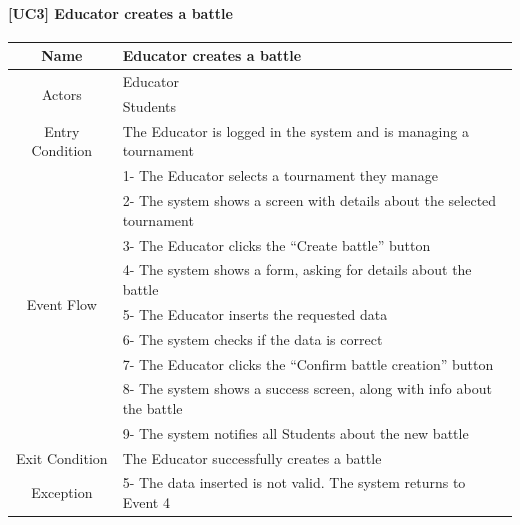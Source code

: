 \documentclass{article}
\begin{document}
\paragraph{[UC3] Educator creates a battle}
\begin{center}
\begin{tabular}{|c|m{40em}|}
\hline
Name & Educator creates a battle\\
\hline
\multirow{2}{4em}{Actors}
& Educator\\
& Students\\
\hline
Entry Condition & The Educator is logged in the system and is managing a tournament\\
\hline
\multirow{9}{4em}{Event Flow}
& 1- The Educator selects a tournament they manage\\
& 2- The system shows a screen with details about the selected tournament\\
& 3- The Educator clicks the “Create battle” button\\
& 4- The system shows a form, asking for details about the battle\\
& 5- The Educator inserts the requested data\\
& 6- The system checks if the data is correct\\
& 7- The Educator clicks the “Confirm battle creation” button\\
& 8- The system shows a success screen, along with info about the battle\\
& 9- The system notifies all Students about the new battle\\
\hline
Exit Condition & The Educator successfully creates a battle\\
\hline
Exception & 5- The data inserted is not valid. The system returns to Event 4\\
\hline
\end{tabular}
\end{center}
\end{document}
